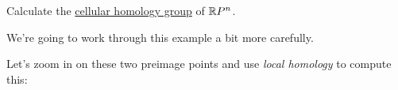 \begin{exercise}
	Calculate the \hyperref[def:cellular-homology-group]{cellular homology group} of \(\mathbb{\MakeUppercase{r}} P^n\).
\end{exercise}

\begin{eg}
	We're going to work through this example a bit more carefully.
	\begin{figure}[H]
		\centering
		\label{fig:eg:more-careful-torus-cellular}
	\end{figure}
	Let's zoom in on these two preimage points and use \emph{local homology} to compute this:
\end{eg}